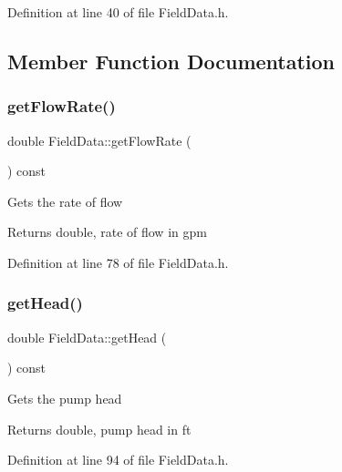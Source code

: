 Definition at line 40 of file Field\+Data.\+h.



\subsection{Member Function Documentation}
\mbox{\label{class_field_data_a59b3261a5162b002d7b73a2d35561bd0}} 
\subsubsection{\texorpdfstring{get\+Flow\+Rate()}{getFlowRate()}}
{\footnotesize\ttfamily double Field\+Data\+::get\+Flow\+Rate (\begin{DoxyParamCaption}{ }\end{DoxyParamCaption}) const\hspace{0.3cm}{\ttfamily [inline]}}

Gets the rate of flow \begin{DoxyReturn}{Returns}
double, rate of flow in gpm 
\end{DoxyReturn}


Definition at line 78 of file Field\+Data.\+h.

\mbox{\label{class_field_data_ac3e8e0b2de226c858b6c92cdb454bd0d}} 
\subsubsection{\texorpdfstring{get\+Head()}{getHead()}}
{\footnotesize\ttfamily double Field\+Data\+::get\+Head (\begin{DoxyParamCaption}{ }\end{DoxyParamCaption}) const\hspace{0.3cm}{\ttfamily [inline]}}

Gets the pump head \begin{DoxyReturn}{Returns}
double, pump head in ft 
\end{DoxyReturn}


Definition at line 94 of file Field\+Data.\+h.

\mbox{\label{class_field_data_ae213fa76dd005d7fd251ef26beecd311}} 

